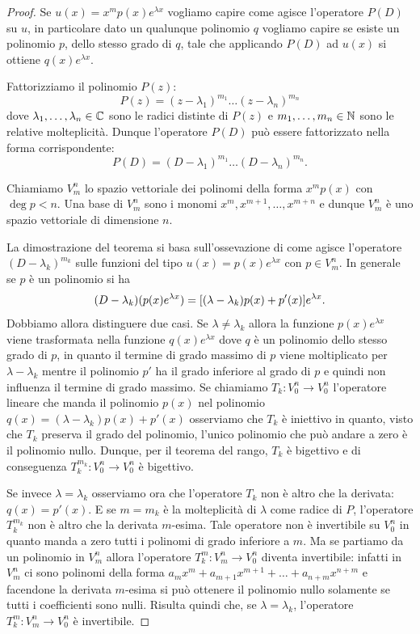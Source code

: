 \begin{proof}
Se $u(x) = x^m p(x) e^{\lambda x}$ vogliamo capire come agisce l'operatore $P(D)$ su $u$, in particolare
dato un qualunque polinomio $q$ vogliamo capire
se esiste un polinomio $p$, dello stesso grado di $q$, tale che applicando $P(D)$ ad $u(x)$ si ottiene $q(x) e^{\lambda x}$.

Fattorizziamo il polinomio $P(z)$:
\[
  P(z) = (z-\lambda_1)^{m_1}\dots (z-\lambda_n)^{m_n}
\]
dove $\lambda_1, \dots, \lambda_n\in \mathbb C$ sono le radici distinte di $P(z)$ e $m_1,\dots,m_n\in \mathbb N$ sono le relative molteplicità. Dunque l'operatore $P(D)$ può essere fattorizzato nella forma corrispondente:
\[
   P(D) = (D-\lambda_1)^{m_1} \dots (D-\lambda_n)^{m_n}.
\]

Chiamiamo $V^n_m$ lo spazio vettoriale dei polinomi della forma $x^m p(x)$ con $\deg p<n$. Una base di $V^n_m$ sono i monomi $x^m, x^{m+1}, \dots, x^{m+n}$ e dunque $V^n_m$ è uno spazio vettoriale di dimensione $n$.

La dimostrazione del teorema si basa sull'ossevazione di come agisce l'operatore $(D-\lambda_k)^{m_k}$ sulle funzioni del tipo $u(x) = p(x) e^{\lambda x}$ con $p\in V^n_m$. In generale se $p$ è un polinomio si ha
\[
 (D-\lambda_k)(p(x)e^{\lambda x})
 = {\left[ (\lambda -\lambda_k)p(x) + p'(x) \right]} e^{\lambda x}.
\]
Dobbiamo allora distinguere due casi. Se $\lambda\neq \lambda_k$ allora la funzione $p(x) e^{\lambda x}$ viene trasformata nella funzione $q(x) e^{\lambda x}$ dove $q$ è un polinomio dello stesso grado di $p$, in quanto il termine di grado massimo di $p$ viene moltiplicato per $\lambda-\lambda_k$ mentre il polinomio $p'$ ha il grado inferiore al grado di $p$ e quindi non influenza il termine di grado massimo. Se chiamiamo $T_k\colon V^n_0 \to V^n_0$ l'operatore lineare che manda il polinomio $p(x)$ nel polinomio $q(x)=(\lambda-\lambda_k) p(x) + p'(x)$ osserviamo che $T_k$ è iniettivo in quanto, visto che $T_k$ preserva il grado del polinomio, l'unico polinomio che può andare a zero è il polinomio nullo. Dunque, per il teorema del rango, $T_k$ è bigettivo e di conseguenza $T_k^{m_k} \colon V^n_0 \to V^n_0$ è bigettivo.

Se invece $\lambda = \lambda_k$ osserviamo ora che l'operatore $T_k$ 
non è altro che la derivata: $q(x) = p'(x)$. 
E se $m=m_k$ è la molteplicità di $\lambda$ come radice di $P$, 
l'operatore $T_k^{m_k}$ non è altro che la derivata $m$-esima. 
Tale operatore non è invertibile su $V^n_0$ in quanto manda a zero tutti 
i polinomi di grado inferiore a $m$. Ma se partiamo da un polinomio in $V^n_m$ 
allora l'operatore $T_k^m\colon V^n_m \to V^n_0$ diventa invertibile: 
infatti in $V^n_m$ ci sono polinomi della forma 
$a_m x^m + a_{m+1}x^{m+1} + \dots + a_{n+m}x^{n+m}$
e facendone la derivata $m$-esima si può ottenere il polinomio nullo solamente 
se tutti i coefficienti sono nulli.
Risulta quindi che, se $\lambda = \lambda_k$, 
l'operatore $T_k^m\colon V^n_m \to V^n_0$ è invertibile.


\end{proof}
